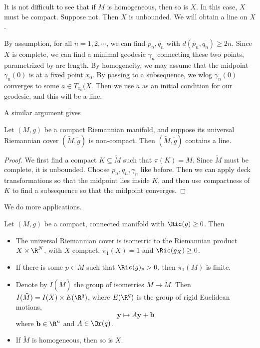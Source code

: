 \documentclass[a4paper]{article}
\begin{document}
It is not difficult to see that if $M$ is homogeneous, then so is $X$. In this case, $X$ must be compact. Suppose not. Then $X$ is unbounded. We will obtain a line on $X$.

By assumption, for all $n = 1, 2, \cdots$, we can find $p_n, q_n$ with $d(p_n, q_n) \geq 2n$. Since $X$ is complete, we can find a minimal geodesic $\gamma_n$ connecting these two points, parametrized by arc length. By homogeneity, we may assume that the midpoint $\gamma_n(0)$ is at a fixed point $x_0$. By passing to a subsequence, we wlog $\dot{\gamma}_n(0)$ converges to some $a \in T_{x_0}(X$. Then we use $a$ as an initial condition for our geodesic, and this will be a line.

A similar argument gives
\begin{lemma}
  Let $(M, g)$ be a compact Riemannian manifold, and suppose its universal Riemannian cover $(\tilde{M}, \tilde{g})$ is non-compact. Then $(\tilde{M}, \tilde{g})$ contains a line.
\end{lemma}

\begin{proof}
  We first find a compact $K \subseteq \tilde{M}$ such that $\pi(K) = M$. Since $\tilde{M}$ must be complete, it is unbounded. Choose $p_n, q_n, \gamma_n$ like before. Then we can apply deck transformations so that the midpoint lies inside $K$, and then use compactness of $K$ to find a subsequence so that the midpoint converges.
\end{proof}

We do more applications.

\begin{cor}
  Let $(M, g)$ be a compact, connected manifold with $\Ric(g) \geq 0$. Then
  \begin{itemize}
    \item The universal Riemannian cover is isometric to the Riemannian product $X \times \R^N$, with $X$ compact, $\pi_1(X) = 1$ and $\Ric(g_X) \geq 0$.
    \item If there is some $p \in M$ such that $\Ric(g)_p > 0$, then $\pi_1(M)$ is finite.
    \item Denote by $I(\tilde{M})$ the group of isometries $\tilde{M} \to \tilde{M}$. Then $I (\tilde{M}) = I(X) \times E(\R^q)$, where $E(\R^q)$ is the group of rigid Euclidean motions,
      \[
        \mathbf{y} \mapsto A\mathbf{y} + \mathbf{b}
      \]
      where $\mathbf{b} \in \R^n$ and $A \in \Or(q)$.
    \item If $\tilde{M}$ is homogeneous, then so is $X$.
  \end{itemize}
\end{cor}
\end{document}

